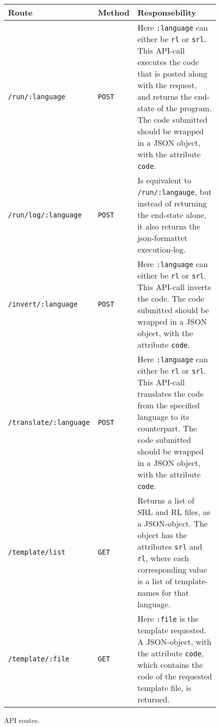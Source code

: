 \begin{figure}[H]
  \begin{tabular}{|l|l|p{6.7cm}|}\hline
    \textbf{Route} & \textbf{Method} & \textbf{Responsebility}\\\hline
    \texttt{/run/:language} & \texttt{POST} & Here \texttt{:language} can either be \texttt{rl} or \texttt{srl}.
                                                This API-call executes the code that is posted along with the request, and returns the end-state of the program.
                                                The code submitted should be wrapped in a JSON object, with the attribute \texttt{code}.\\\hline
    \texttt{/run/log/:language} & \texttt{POST} & Is equivalent to \texttt{/run/:langauge}, but instead of returning the end-state
                                                    alone, it also returns the json-formattet execution-log.\\\hline
    \texttt{/invert/:language} & \texttt{POST} & Here \texttt{:language} can either be \texttt{rl} or \texttt{srl}.
                                                This API-call inverts the code.
                                                The code submitted should be wrapped in a JSON object, with the attribute \texttt{code}.\\\hline
    \texttt{/translate/:language} & \texttt{POST} & Here \texttt{:language} can either be \texttt{rl} or \texttt{srl}.
                                                This API-call translates the code from the specified language to its counterpart.
                                                The code submitted should be wrapped in a JSON object, with the attribute \texttt{code}.\\\hline
    \texttt{/template/list}  & \texttt{GET} & Returns a list of SRL and RL files, as a JSON-object. The object has the attributes \texttt{srl} and \texttt{rl}, where each corresponding value is a list of template-names for that language. \\\hline
    \texttt{/template/:file} & \texttt{GET} & Here \texttt{:file} is the template requested.
                                              A JSON-object, with the attribute \texttt{code}, which contains the code of the requested template file, is returned.\\\hline
  \end{tabular}
  \caption{API routes.}
  \label{fig:full_api}
\end{figure}

